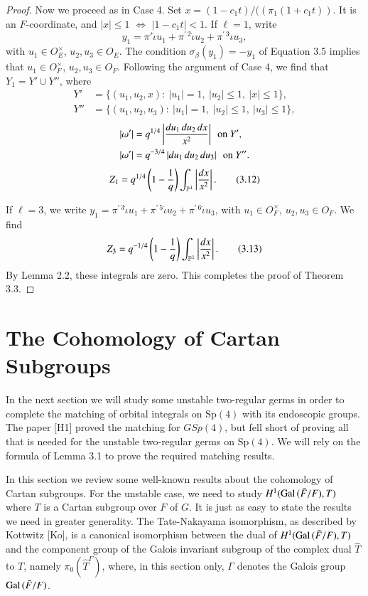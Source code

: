 \documentclass{amsart}
\newcommand\jota{{\dot\iota}}
\newcommand\bP{{\mathbb P}}
\newcommand\leftd[1]{\left | {d#1\over #1^2}\right |}
\newcommand\leftdx{\leftd x}
\newcommand\Gal{\hbox{Gal\,}}
\newcommand\bF{{\bar F}}
\begin{document}
\begin{proof}
Now we proceed as in Case 4.  Set $x = (1-c_1 t)/((\pi_1 (1+c_1 t))$.
It is an $F$-coordinate, and $|x|\le 1$ $\Leftrightarrow$
$|1-c_1 t|<1$.  If $\ell=1$, write
$$y_1 = \pi'\jota u_1 + \pi^{\prime\,2}\jota u_2 + \pi^{\prime\,3}\jota u_3,$$
with $u_1\in O_E^\times$, $u_2,u_3\in O_E$.  The condition 
$\sigma_\beta(y_1)=-y_1$
of Equation 3.5 implies that $u_1\in O_F^\times$, $u_2,u_3\in O_F$.
Following the argument of Case 4, we find that $Y_1 = Y'\cup Y''$, where
\begin{align*}
Y'&=\{(u_1,u_2,x): \ |u_1|=1,\ |u_2|\le 1,\ |x|\le 1\},\\
Y''&=\{(u_1,u_2,u_3):\ |u_1|=1,\ |u_2|\le 1,\ |u_3|\le 1\},
\end{align*}
%
\begin{align*}
|\omega'| &= q^{1/4}\left|{du_1\, du_2\, dx\over x^2}\right|
\ \text{ on } Y',\\
|\omega'| &= q^{-3/4}\left|du_1\,du_2\,du_3\right|\ 
\text{ on } Y''.
\end{align*}
%
\begin{equation}
Z_1 = q^{1/4} \left(1-{1\over q}\right) \int_{\bP^1} \leftdx.
\tag{3.12}
\end{equation}

If $\ell=3$, we write $y_1 = 
\pi^{\prime\,3}\jota u_1 + \pi^{\prime\,5}\jota u_2
+\pi^{\prime\,6}\jota u_3$,
with $u_1\in O_F^\times$, $u_2,u_3\in O_F$.  We find
\begin{equation}
Z_3 = q^{-1/4} \left(1-{1\over q}\right ) \int_{\bP^1}\leftdx.
\tag {3.13}
\end{equation}
By Lemma 2.2, these integrals are zero.
This completes the proof of Theorem 3.3.
\end{proof} 

\section{The Cohomology of Cartan Subgroups}

In the next section we will study some unstable two-regular
germs in order to complete the matching of orbital integrals
on $\text{Sp}(4)$ with its endoscopic groups.  The paper [H1] proved
the matching for $GSp(4)$, but fell short of proving all that
is needed for the unstable two-regular germs on $\text{Sp}(4)$.
We will rely on the formula of Lemma 3.1 to prove
the required matching results.

In this section we review some well-known results about
the cohomology of Cartan subgroups. For the unstable case,
we need to study $H^1(\Gal(\bF/F),T)$ where $T$ is a
Cartan subgroup over $F$ of $G$.  It is just as easy
to state the results we need in greater generality.
The Tate-Nakayama isomorphism,
as described by Kottwitz [Ko], is a canonical isomorphism
between the dual of $H^1(\Gal(\bF/F),T)$ and the component
group of the Galois invariant subgroup of the complex dual $\hat T$
to $T$, namely $\pi_0(\hat T^\Gamma)$, where, in this section only,
$\Gamma$ denotes
the Galois group $\Gal(\bF/F)$.
\end{document}
